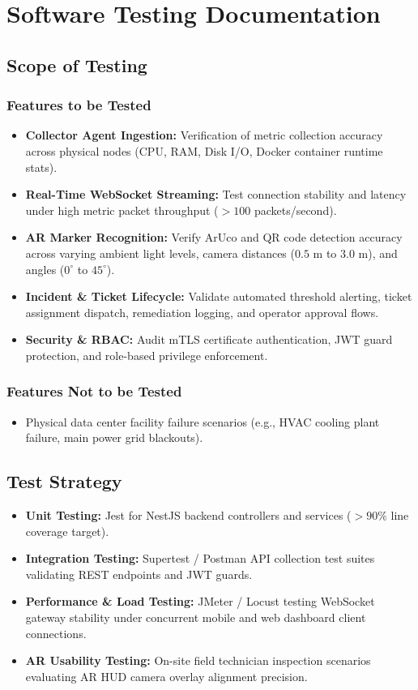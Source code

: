 \chapter{Software Testing Documentation}

\section{Scope of Testing}

\subsection{Features to be Tested}
\begin{itemize}
    \item \textbf{Collector Agent Ingestion:} Verification of metric collection accuracy across physical nodes (CPU, RAM, Disk I/O, Docker container runtime stats).
    \item \textbf{Real-Time WebSocket Streaming:} Test connection stability and latency under high metric packet throughput ($>100$ packets/second).
    \item \textbf{AR Marker Recognition:} Verify ArUco and QR code detection accuracy across varying ambient light levels, camera distances ($0.5$ m to $3.0$ m), and angles ($0^\circ$ to $45^\circ$).
    \item \textbf{Incident \& Ticket Lifecycle:} Validate automated threshold alerting, ticket assignment dispatch, remediation logging, and operator approval flows.
    \item \textbf{Security \& RBAC:} Audit mTLS certificate authentication, JWT guard protection, and role-based privilege enforcement.
\end{itemize}

\subsection{Features Not to be Tested}
\begin{itemize}
    \item Physical data center facility failure scenarios (e.g., HVAC cooling plant failure, main power grid blackouts).
\end{itemize}

\section{Test Strategy}
\begin{itemize}
    \item \textbf{Unit Testing:} Jest for NestJS backend controllers and services ($>90\%$ line coverage target).
    \item \textbf{Integration Testing:} Supertest / Postman API collection test suites validating REST endpoints and JWT guards.
    \item \textbf{Performance \& Load Testing:} JMeter / Locust testing WebSocket gateway stability under concurrent mobile and web dashboard client connections.
    \item \textbf{AR Usability Testing:} On-site field technician inspection scenarios evaluating AR HUD camera overlay alignment precision.
\end{itemize}


